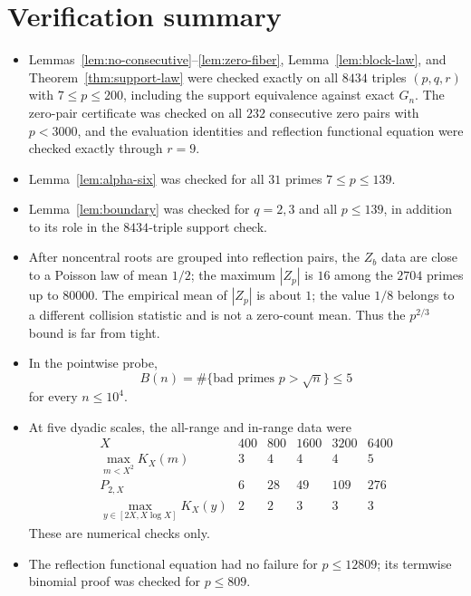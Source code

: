 \documentclass[11pt]{amsart}
\theoremstyle{plain}
\theoremstyle{remark}
\begin{document}
\appendix

\section{Verification summary}

\begin{itemize}
\item Lemmas~\ref{lem:no-consecutive}--\ref{lem:zero-fiber},
Lemma~\ref{lem:block-law}, and Theorem~\ref{thm:support-law} were checked
exactly on all $8434$ triples $(p,q,r)$ with $7\leq p\leq200$, including
the support equivalence against exact $G_n$.  The zero-pair certificate
was checked on all $232$ consecutive zero pairs with $p<3000$, and the
evaluation identities and reflection functional equation were checked
exactly through $r=9$.

\item Lemma~\ref{lem:alpha-six} was checked for all $31$ primes
$7\leq p\leq139$.

\item Lemma~\ref{lem:boundary} was checked for $q=2,3$ and all
$p\leq139$, in addition to its role in the $8434$-triple support check.

\item After noncentral roots are grouped into reflection pairs, the
$Z_b$ data are close to a Poisson law of mean $1/2$; the maximum
$|Z_p|$ is $16$ among the $2704$ primes up to $80000$.  The empirical
mean of $|Z_p|$ is about $1$; the value $1/8$ belongs to a different
collision statistic and is not a zero-count mean.  Thus the $p^{2/3}$
bound is far from tight.

\item In the pointwise probe,
\[
 B(n)=\#\{\text{bad primes }p>\sqrt n\}\leq5
\]
for every $n\leq10^4$.

\item At five dyadic scales, the all-range and in-range data were
\[
 \begin{array}{c|ccccc}
 X&400&800&1600&3200&6400\\ \hline
 \max_{m<X^2}K_X(m)&3&4&4&4&5\\
 P_{2,X}&6&28&49&109&276\\
 \max_{y\in[2X,X\log X]}K_X(y)&2&2&3&3&3
 \end{array}
\]
These are numerical checks only.

\item The reflection functional equation had no failure for
$p\leq12809$; its termwise binomial proof was checked for $p\leq809$.


\end{itemize}
\end{document}
